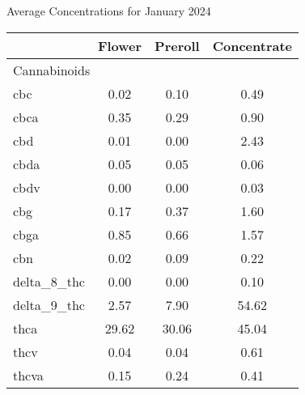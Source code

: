 \begin{table}[H]
\centering
Average Concentrations for January 2024
\begin{tabular}{lccc}
\hline\ & Flower & Preroll & Concentrate \\
\hline
\multicolumn{4}{l}{Cannabinoids} \\
\hline
cbc & 0.02 & 0.10 & 0.49 \\
cbca & 0.35 & 0.29 & 0.90 \\
cbd & 0.01 & 0.00 & 2.43 \\
cbda & 0.05 & 0.05 & 0.06 \\
cbdv & 0.00 & 0.00 & 0.03 \\
cbg & 0.17 & 0.37 & 1.60 \\
cbga & 0.85 & 0.66 & 1.57 \\
cbn & 0.02 & 0.09 & 0.22 \\
delta\_8\_thc & 0.00 & 0.00 & 0.10 \\
delta\_9\_thc & 2.57 & 7.90 & 54.62 \\
thca & 29.62 & 30.06 & 45.04 \\
thcv & 0.04 & 0.04 & 0.61 \\
thcva & 0.15 & 0.24 & 0.41 \\
\hline
\end{tabular}
\end{table}
